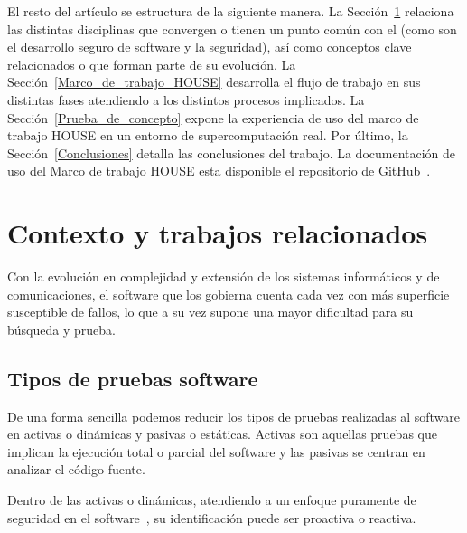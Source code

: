 \documentclass[10pt,conference,a4paper]{IEEEtran}
\begin{document}

El resto del artículo se estructura de la siguiente manera. La Sección~\ref{Contexto-trabajos_relacionados} relaciona las distintas disciplinas que convergen o tienen un punto común con el {\fz} (como son el desarrollo seguro de software y la seguridad), así como conceptos clave relacionados o que forman parte de su evolución. La Sección~\ref{Marco_de_trabajo_HOUSE} desarrolla el flujo de trabajo en sus distintas fases atendiendo a los distintos procesos implicados. La Sección~\ref{Prueba_de_concepto} expone la experiencia de uso del marco de trabajo HOUSE en un entorno de supercomputación real. Por último, la Sección~\ref{Conclusiones} detalla las conclusiones del trabajo.
La documentación de uso del Marco de trabajo HOUSE esta disponible el repositorio de GitHub~\cite{HOUSE_ref-github_repo}.

\section{Contexto y trabajos relacionados}  \label{Contexto-trabajos_relacionados}

Con la evolución en complejidad y extensión de los sistemas informáticos y de comunicaciones, el software que los gobierna cuenta cada vez con más superficie susceptible de fallos, lo que a su vez supone una mayor dificultad para su búsqueda y prueba.

\subsection{Tipos de pruebas software}

De una forma sencilla podemos reducir los tipos de pruebas realizadas al software en activas o dinámicas y pasivas o estáticas. Activas son aquellas pruebas que implican la ejecución total o parcial del software y las pasivas se centran en analizar el código fuente.

Dentro de las activas o dinámicas, atendiendo a un enfoque puramente de seguridad en el software~\cite{fuzz_ref_sec-qa_sw}, su identificación puede ser proactiva o reactiva.
\end{document}
